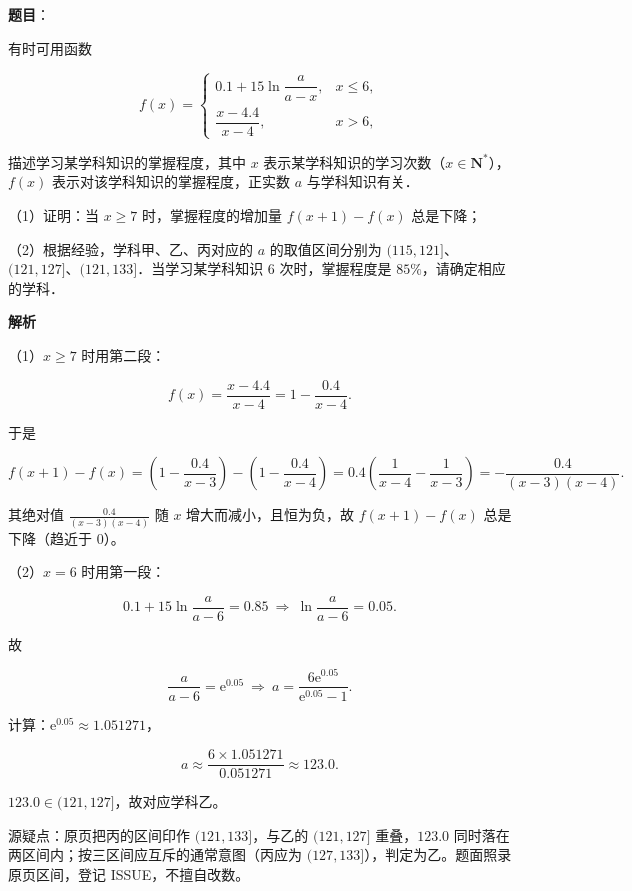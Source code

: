 \begin{answer}

\textbf{题目}：

有时可用函数

\nopagebreak[4]
\[f(x)=\begin{cases}0.1+15\ln\dfrac{a}{a-x},&x\leqslant6,\\[6pt] \dfrac{x-4.4}{x-4},&x>6,\end{cases}\]

描述学习某学科知识的掌握程度，其中 $x$ 表示某学科知识的学习次数（$x\in\mathbf N^*$），$f(x)$ 表示对该学科知识的掌握程度，正实数 $a$ 与学科知识有关．

（1）证明：当 $x\geqslant7$ 时，掌握程度的增加量 $f(x+1)-f(x)$ 总是下降；

（2）根据经验，学科甲、乙、丙对应的 $a$ 的取值区间分别为 $(115,121]$、$(121,127]$、$(121,133]$．当学习某学科知识 $6$ 次时，掌握程度是 $85\%$，请确定相应的学科．

\textbf{解析}

（1）$x\geqslant7$ 时用第二段：

\nopagebreak[4]
\[f(x)=\frac{x-4.4}{x-4}=1-\frac{0.4}{x-4}.\]

于是

\nopagebreak[4]
\[f(x+1)-f(x)
=\left(1-\frac{0.4}{x-3}\right)-\left(1-\frac{0.4}{x-4}\right)
=0.4\left(\frac{1}{x-4}-\frac{1}{x-3}\right)
=-\frac{0.4}{(x-3)(x-4)} .\]

其绝对值 $\frac{0.4}{(x-3)(x-4)}$ 随 $x$ 增大而减小，且恒为负，故 $f(x+1)-f(x)$ 总是下降（趋近于 $0$）。

（2）$x=6$ 时用第一段：

\nopagebreak[4]
\[0.1+15\ln\frac{a}{a-6}=0.85
\ \Longrightarrow\ \ln\frac{a}{a-6}=0.05 .\]

故

\nopagebreak[4]
\[\frac{a}{a-6}=\mathrm e^{0.05}
\ \Longrightarrow\ a=\frac{6\mathrm e^{0.05}}{\mathrm e^{0.05}-1}.\]

计算：$\mathrm e^{0.05}\approx1.051271$，

\nopagebreak[4]
\[a\approx\frac{6\times1.051271}{0.051271}\approx123.0 .\]

$123.0\in(121,127]$，故对应学科乙。

\begin{gktip}
源疑点：原页把丙的区间印作 $(121,133]$，与乙的 $(121,127]$ 重叠，$123.0$ 同时落在两区间内；按三区间应互斥的通常意图（丙应为 $(127,133]$），判定为乙。题面照录原页区间，登记 ISSUE，不擅自改数。
\end{gktip}


\end{answer}

